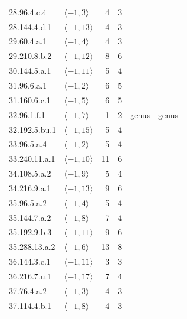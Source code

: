 \begin{longtable}{llrrll}
28.96.4.c.4 & $\langle -1,3\rangle$ & 4 & 3 & \cite{Orlic2025} & \cite{Orlic2025}\\
28.144.4.d.1 & $\langle -1,13\rangle$ & 4 & 3 & \cite{Orlic2025} & \cite{Orlic2025}\\
29.60.4.a.1 & $\langle -1,4\rangle$ & 4 & 3 & \cite{Orlic2025} & \cite{Orlic2025}\\
29.210.8.b.2 & $\langle -1,12\rangle$ & 8 & 6 & \cite{Orlic2025} & \cite{Orlic2025}\\
30.144.5.a.1 & $\langle -1,11\rangle$ & 5 & 4 & \cite{Orlic2025} & \cite{Orlic2025}\\
31.96.6.a.1 & $\langle -1,2\rangle$ & 6 & 5 & \cite{Orlic2025} & \cite{Orlic2025}\\
31.160.6.c.1 & $\langle -1,5\rangle$ & 6 & 5 & \cite{Orlic2025} & \cite{Orlic2025}\\
32.96.1.f.1 & $\langle -1,7\rangle$ & 1 & 2 & genus & genus\\
32.192.5.bu.1 & $\langle -1,15\rangle$ & 5 & 4 & \cite{Orlic2025} & \cite{Orlic2025}\\
33.96.5.a.4 & $\langle -1,2\rangle$ & 5 & 4 & \cite{Orlic2025} & \cite{Orlic2025}\\
33.240.11.a.1 & $\langle -1,10\rangle$ & 11 & 6 & \cite{Orlic2025} & \cite{Orlic2025}\\
34.108.5.a.2 & $\langle -1,9\rangle$ & 5 & 4 & \cite{Orlic2025} & \cite{Orlic2025}\\
34.216.9.a.1 & $\langle -1,13\rangle$ & 9 & 6 & \cite{Orlic2025} & \cite{Orlic2025}\\
35.96.5.a.2 & $\langle -1,4\rangle$ & 5 & 4 & \cite{Orlic2025} & \cite{Orlic2025}\\
35.144.7.a.2 & $\langle -1,8\rangle$ & 7 & 4 & \cite{Orlic2025} & \cite{Orlic2025}\\
35.192.9.b.3 & $\langle -1,11\rangle$ & 9 & 6 & \cite{Orlic2025} & \cite{Orlic2025}\\
35.288.13.a.2 & $\langle -1,6\rangle$ & 13 & 8 & \cite{Orlic2025} & \cite{Orlic2025}\\
36.144.3.c.1 & $\langle -1,11\rangle$ & 3 & 3 & \cite{Orlic2025} & \cite{Orlic2025}\\
36.216.7.u.1 & $\langle -1,17\rangle$ & 7 & 4 & \cite{Orlic2025} & \cite{Orlic2025}\\
37.76.4.a.2 & $\langle -1,3\rangle$ & 4 & 3 & \cite{Orlic2025} & \cite{Orlic2025}\\
37.114.4.b.1 & $\langle -1,8\rangle$ & 4 & 3 & \cite{Orlic2025} & \cite{Orlic2025}\\

\end{longtable}
